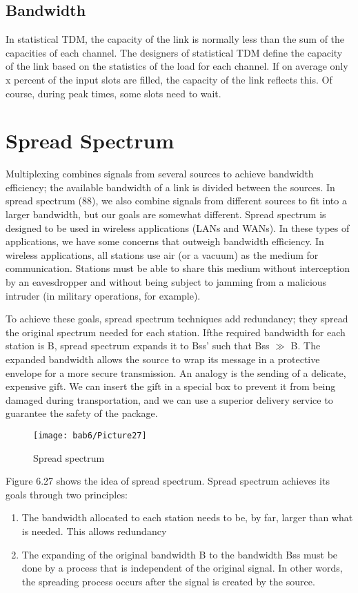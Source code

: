\subsection*{Bandwidth}
In statistical TDM, the capacity of the link is normally less than the sum of the capacities of each channel. The designers of statistical TDM define the capacity of the link based on the statistics of the load for each channel. If on average only x percent of the input slots are filled, the capacity of the link reflects this. Of course, during peak times, some slots need to wait.


\section{Spread Spectrum}
Multiplexing combines signals from several sources to achieve bandwidth efficiency; the available bandwidth of a link is divided between the sources. In spread spectrum (88), we also combine signals from different sources to fit into a larger bandwidth, but our goals are somewhat different. Spread spectrum is designed to be used in wireless applications (LANs and WANs). In these types of applications, we have some concerns that outweigh bandwidth efficiency. In wireless applications, all stations use air (or a vacuum) as the medium for communication. Stations must be able to share this medium without interception by an eavesdropper and without being subject to jamming from a malicious intruder (in military operations, for example).

To achieve these goals, spread spectrum techniques add redundancy; they spread the original spectrum needed for each station. Ifthe required bandwidth for each station is B, spread spectrum expands it to Bss' such that Bss $\gg$ B. The expanded bandwidth allows the source to wrap its message in a protective envelope for a more secure transmission. An analogy is the sending of a delicate, expensive gift. We can insert the gift in a special box to prevent it from being damaged during transportation, and we can use a superior delivery service to guarantee the safety of the package.

\begin{figure}[htbp]
  \centering
  \texttt{[image: bab6/Picture27]}
  \caption{Spread spectrum}
  \label{fig6:26}
\end{figure}

Figure 6.27 shows the idea of spread spectrum. Spread spectrum achieves its goals through two principles:
\begin{enumerate}
  \item The bandwidth allocated to each station needs to be, by far, larger than what is needed. This allows redundancy
  \item The expanding of the original bandwidth B to the bandwidth Bss must be done by a process that is independent of the original signal. In other words, the spreading process occurs after the signal is created by the source.
\end{enumerate}

